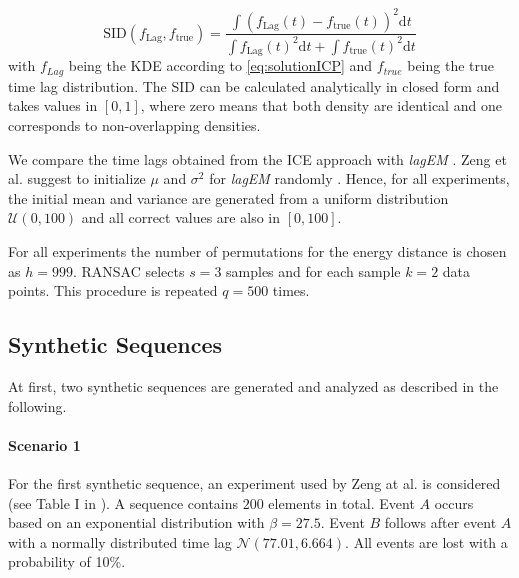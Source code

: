 \documentclass[conference]{IEEEtran}
\theoremstyle{examplestyle}
\begin{document}
\begin{equation}
	\text{SID}(f_{\text{Lag}}, f_{\text{true}}) = \frac{\int \left( f_{\text{Lag}} (t) - f_{\text{true}}(t) \right)^2 \text{d} t}{\int f_{\text{Lag}} (t)^2 \text{d} t + \int f_{\text{true}}(t)^2 \text{d} t}
\end{equation}
with $f_{Lag}$ being the KDE according to \eqref{eq:solutionICP} and $f_{true}$ being the true time lag distribution. The SID can be calculated analytically in closed form and takes values in $[0,1]$, where zero means that both density are identical and one corresponds to non-overlapping densities.


We compare the time lags obtained from the \ac{ICE} approach with \textit{lagEM} \cite{Zeng2015}.
Zeng et al. suggest to initialize \(\mu\) and \(\sigma^2\) for \textit{lagEM} randomly \cite{Zeng2015}. Hence, for all experiments, the initial mean and variance are generated from a uniform distribution \(\mathcal{U}(0, 100)\) and all correct values are also in \([0, 100]\).


For all experiments the number of permutations for the energy distance is chosen as \(h = 999\). \ac{RANSAC} selects \(s = 3\) samples and for each sample \(k = 2\) data points. This procedure is repeated \(q = 500\) times.



\subsection{Synthetic Sequences}
At first, two synthetic sequences are generated and analyzed as described in the following.
\paragraph{Scenario 1}
For the first synthetic sequence, an experiment used by Zeng at al. is considered (see Table I in \cite{Zeng2015}). A sequence contains $200$ elements in total. Event \(A\) occurs based on an exponential distribution with \(\beta = 27.5\). Event \(B\) follows after event \(A\) with a normally distributed time lag \(\mathcal{N}(77.01, 6.664)\). All events are lost with a probability of 10\%.
\end{document}
